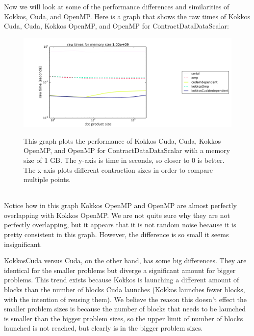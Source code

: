 Now we will look at some of the performance differences and similarities of
Kokkos, Cuda, and OpenMP. Here is a graph that shows the raw times of Kokkos
Cuda, Cuda, Kokkos OpenMP, and OpenMP for ContractDataDataScalar: \\
\begin{figure}[!ht]
{\includegraphics[scale=.4]{CDDS_RawTimes_2d_largestSize_Comparison.pdf}}
\caption[ContractDataDataScalar Kokkos performance comparison]{This graph plots the performance of Kokkos Cuda, Cuda, Kokkos OpenMP,
and OpenMP for ContractDataDataScalar with a memory size of 1 GB. 
The y-axis is time in
seconds, so closer to 0 is better. The x-axis plots different contraction sizes
in order to compare multiple points.}
\label{fig:ContractDataDataScalar Kokkos performance comparison}
\end{figure} \\
Notice how in this graph Kokkos OpenMP and OpenMP are almost perfectly
overlapping with Kokkos OpenMP. We are not quite sure why they are not perfectly
overlapping, but it appears that it is not random noise because it is pretty
consistent in this graph. However, the difference is so small it seems
insignificant. 

KokkosCuda versus Cuda, on the other hand, has some big differences. They are
identical for the smaller problems but diverge a significant amount for bigger
problems. This trend exists because Kokkos is launching a different amount of blocks than the number of blocks Cuda launches 
(Kokkos launches fewer blocks, with the intention of reusing them).
We believe the reason this doesn't effect the smaller problem sizes is because
the number of blocks that needs to be launched is smaller than the bigger problem sizes, so
the upper limit of number of blocks launched is not reached, but clearly is in the bigger problem sizes. 

